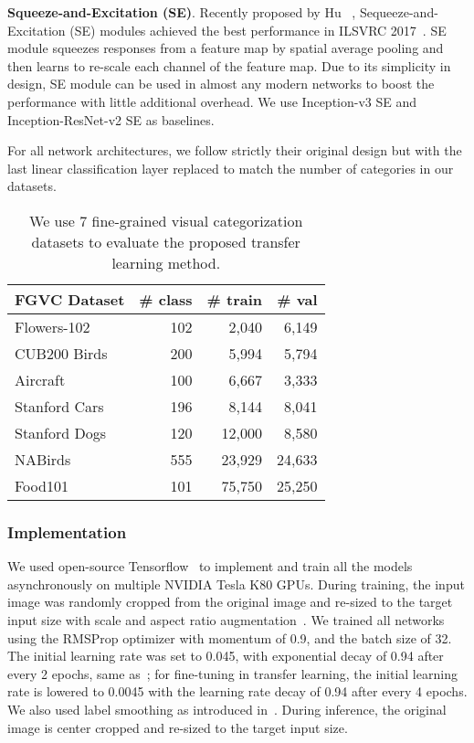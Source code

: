 \documentclass[10pt,twocolumn,letterpaper]{article}
\begin{document}
\textbf{Squeeze-and-Excitation (SE)}.
Recently proposed by Hu \etal~\cite{senet}, Sequeeze-and-Excitation (SE) modules achieved the best performance in ILSVRC 2017~\cite{ilsvrc}.
SE module squeezes responses from a feature map by spatial average pooling and then learns to re-scale each channel of the feature map.
Due to its simplicity in design, SE module can be used in almost any modern networks to boost the performance with little additional overhead.
We use Inception-v3 SE and Inception-ResNet-v2 SE as baselines.

For all network architectures, we follow strictly their original design but with the last linear classification layer replaced to match the number of categories in our datasets.


\begin{table}[t]
\small
\begin{center}
\begin{tabular}{ |l|r|r|r| } 
\hline
FGVC Dataset & \# class & \# train & \# val \\ \hline 
Flowers-102~\cite{flower_102} & 102 & 2,040 & 6,149 \\
CUB200 Birds~\cite{cub200}   & 200 & 5,994 & 5,794 \\
Aircraft~\cite{airplane}       & 100 & 6,667 & 3,333 \\
Stanford Cars~\cite{stanford_car}  & 196 & 8,144 & 8,041 \\
Stanford Dogs~\cite{stanford_dog}  & 120 & 12,000 & 8,580 \\
NABirds~\cite{nabirds}        & 555 & 23,929 & 24,633 \\
Food101~\cite{food101}        & 101 & 75,750 & 25,250 \\ \hline
\end{tabular}
\end{center}
\caption{We use 7 fine-grained visual categorization datasets to evaluate the proposed transfer learning method.}
\label{tab:fgvc_dataset}
\end{table}


\subsubsection{Implementation}
\label{sec:exp_implementation}

We used open-source Tensorflow~\cite{tensorflow} to implement and train all the models asynchronously on multiple NVIDIA Tesla K80 GPUs.
During training, the input image was randomly cropped from the original image and re-sized to the target input size with scale and aspect ratio augmentation~\cite{googlenet}.
We trained all networks using the RMSProp optimizer with momentum of 0.9, and the batch size of 32.
The initial learning rate was set to 0.045, with exponential decay of 0.94 after every 2 epochs, same as~\cite{googlenet}; for fine-tuning in transfer learning, the initial learning rate is lowered to 0.0045 with the learning rate decay of 0.94 after every 4 epochs.
We also used label smoothing as introduced in~\cite{inception-v3}.
During inference, the original image is center cropped and re-sized to the target input size.
\end{document}
